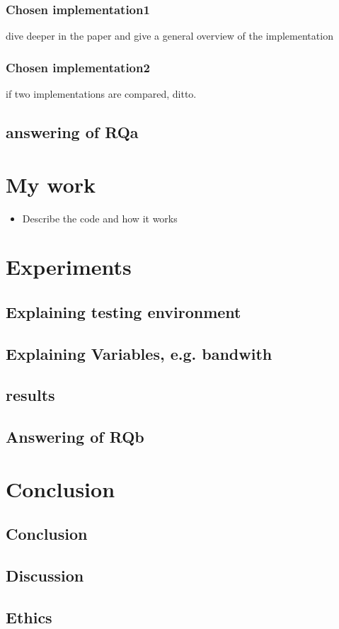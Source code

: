 \documentclass[twoside]{Style/uva-inf-bachelor-thesis}
\begin{document}
\subsection{Chosen implementation1}
dive deeper in the paper and give a general overview of the implementation
\subsection{Chosen implementation2}
if two implementations are compared, ditto.
\section{answering of RQa}

\chapter{My work}
\begin{itemize}
    \item Describe the code and how it works
\end{itemize}

\chapter{Experiments}
\section{Explaining testing environment}
\section{Explaining Variables, e.g. bandwith}
\section{results}
\section{Answering of RQb}

\chapter{Conclusion}
\section{Conclusion}
\section{Discussion}
\section{Ethics}
\end{document}
